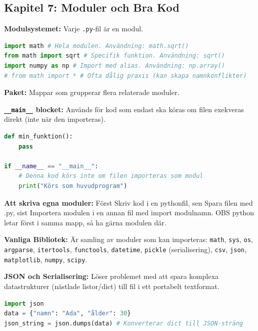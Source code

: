 \documentclass{article}
\begin{document}
\subsection*{Kapitel 7: Moduler och Bra Kod}

\textbf{Modulsystemet:} Varje \texttt{.py}-fil är en modul.
\begin{lstlisting}[language=Python]
import math # Hela modulen. Användning: math.sqrt()
from math import sqrt # Specifik funktion. Användning: sqrt()
import numpy as np # Import med alias. Användning: np.array()
# from math import * # Ofta dålig praxis (kan skapa namnkonflikter)
\end{lstlisting}

\textbf{Paket:} Mappar som grupperar flera relaterade moduler.

\textbf{\texttt{\_\_main\_\_} blocket:}
Används för kod som endast ska köras om filen exekveras direkt (inte när den importeras).
\begin{lstlisting}[language=Python]
def min_funktion():
    pass

if __name__ == "__main__":
    # Denna kod körs inte om filen importeras som modul
    print("Körs som huvudprogram")
\end{lstlisting}


\textbf{Att skriva egna moduler:} Först Skriv kod i en pythonfil, sen Spara filen med .py, sist Importera modulen i en annan fil med import modulnamn. OBS python letar först i samma mapp, så ha gärna modulen där.


\textbf{Vanliga Bibliotek:}
Är samling av moduler som kan importeras: \texttt{math}, \texttt{sys}, \texttt{os}, \texttt{argparse}, \texttt{itertools}, \texttt{functools}, \texttt{datetime}, \texttt{pickle} (serialisering), \texttt{csv}, \texttt{json}, \texttt{matplotlib}, \texttt{numpy}, \texttt{scipy}.


\textbf{JSON och Serialisering:}
Löser problemet med att spara komplexa datastrukturer (nästlade listor/dict) till fil i ett portabelt textformat.
\begin{lstlisting}[language=Python]
import json
data = {"namn": "Ada", "ålder": 30}
json_string = json.dumps(data) # Konverterar dict till JSON-sträng
\end{lstlisting}
\end{document}
